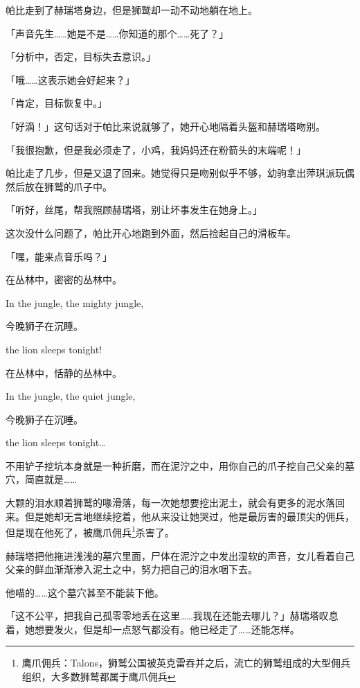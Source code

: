 帕比走到了赫瑞塔身边，但是狮鹫却一动不动地躺在地上。

「声音先生……她是不是……你知道的那个……死了？」

「{\mt 分析中，否定，目标失去意识。}」

「哦……这表示她会好起来？」

「{\mt 肯定，目标恢复中。}」

「好滴！」这句话对于帕比来说就够了，她开心地隔着头盔和赫瑞塔吻别。

「我很抱歉，但是我必须走了，小鸡，我妈妈还在粉箭头的末端呢！」

帕比走了几步，但是又退了回来。她觉得只是吻别似乎不够，幼驹拿出萍琪派玩偶然后放在狮鹫的爪子中。

「听好，丝尾，帮我照顾赫瑞塔，别让坏事发生在她身上。」

这次没什么问题了，帕比开心地跑到外面，然后捡起自己的滑板车。

「嘿，能来点音乐吗？」

\begin{song}
在丛林中，密密的丛林中。

In the jungle, the mighty jungle,

今晚狮子在沉睡。

the lion sleeps tonight!

在丛林中，恬静的丛林中。

In the jungle, the quiet jungle,

今晚狮子在沉睡。

the lion sleeps tonight\dots
\end{song}

\horizonline


不用铲子挖坑本身就是一种折磨，而在泥泞之中，用你自己的爪子挖自己父亲的墓穴，简直就是……

大颗的泪水顺着狮鹫的喙滑落，每一次她想要挖出泥土，就会有更多的泥水落回来。但是她却无言地继续挖着，他从来没让她哭过，他是最厉害的最顶尖的佣兵，但是现在他死了，被鹰爪佣兵\footnote{鹰爪佣兵：Talons，狮鹫公国被英克雷吞并之后，流亡的狮鹫组成的大型佣兵组织，大多数狮鹫都属于鹰爪佣兵}杀害了。

赫瑞塔把他拖进浅浅的墓穴里面，尸体在泥泞之中发出湿软的声音，女儿看着自己父亲的鲜血渐渐渗入泥土之中，努力把自己的泪水咽下去。

他喵的……这个墓穴甚至不能装下他。

「这不公平，把我自己孤零零地丢在这里……我现在还能去哪儿？」赫瑞塔叹息着，她想要发火，但是却一点怒气都没有。他已经走了……还能怎样。

